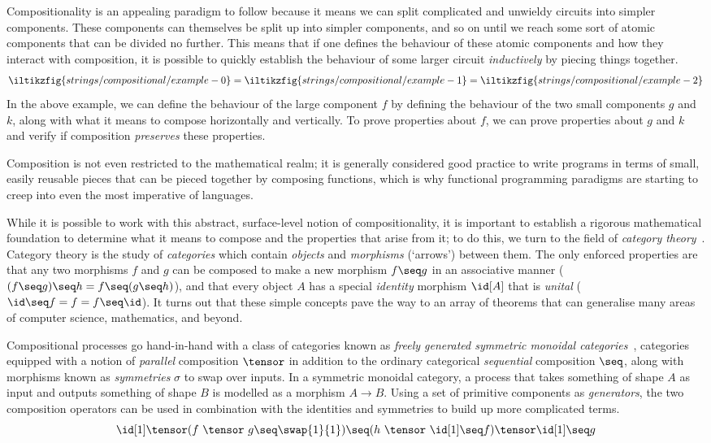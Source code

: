 Compositionality is an appealing paradigm to follow because it means we can
split complicated and unwieldy circuits into simpler components.
These components can themselves be split up into simpler components, and so on
until we reach some sort of atomic components that can be divided no further.
This means that if one defines the behaviour of these atomic components and
how they interact with composition, it is possible to quickly establish the
behaviour of some larger circuit \emph{inductively} by piecing things together.
\[
    \iltikzfig{strings/compositional/example-0}
    =
    \iltikzfig{strings/compositional/example-1}
    =
    \iltikzfig{strings/compositional/example-2}
\]
In the above example, we can define the behaviour of the large component \(f\)
by defining the behaviour of the two small components \(g\) and \(k\), along
with what it means to compose horizontally and vertically.
To prove properties about \(f\), we can prove properties about \(g\) and \(k\)
and verify if composition \emph{preserves} these properties.

Composition is not even restricted to the mathematical realm; it is generally
considered good practice to write programs in terms of small, easily reusable
pieces that can be pieced together by composing functions, which is why
functional programming paradigms are starting to creep into even the most
imperative of languages.

While it is possible to work with this abstract, surface-level notion of
compositionality, it is important to establish a rigorous mathematical
foundation to determine what it means to compose and the properties that
arise from it; to do this, we turn to the field of
\emph{category theory}~\cite{maclane1978categories}.
Category theory is the study of \emph{categories} which contain \emph{objects}
and \emph{morphisms} (`arrows') between them.
The only enforced properties are that any two morphisms \(f\) and \(g\) can be
composed to make a new morphism \(f \seq g\) in an
associative manner (\((f \seq g) \seq h = f \seq (g \seq h)\)), and that every
object \(A\) has a special \emph{identity} morphism \(\id[A]\) that is
\emph{unital} (\(\id \seq f = f = f \seq \id\)).
It turns out that these simple concepts pave the way to an array of
theorems that can generalise many areas of computer science, mathematics, and
beyond.

Compositional processes go hand-in-hand with a class of categories known as
\emph{freely generated symmetric monoidal categories}~\cite{maclane1963natural},
categories equipped with a notion of \emph{parallel} composition \(\tensor\) in
addition to the ordinary categorical \emph{sequential} composition \(\seq\),
along with morphisms known as \emph{symmetries} \(\sigma\) to swap over inputs.
In a symmetric monoidal category, a process that takes something of shape \(A\)
as input and outputs something of shape \(B\) is modelled as a morphism
\(A \to B\).
Using a set of primitive components as \emph{generators}, the two composition
operators can be used in combination with the identities and symmetries to build
up more complicated terms.
\[
    \id[1]
    \tensor
    (f\ \tensor\ g
    \seq
    \swap{1}{1}
    )
    \seq
    (h\ \tensor\ \id[1] \seq f)
    \tensor
    \id[1]
    \seq
    g
\]

